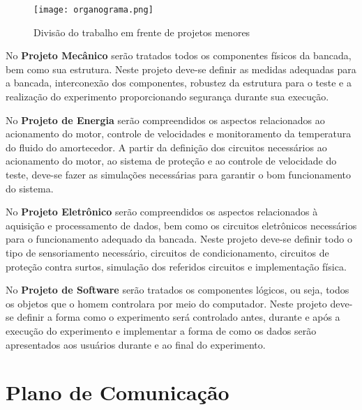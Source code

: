 		\newpage
		\begin{figure}[!h]
			\centering
			\texttt{[image: organograma.png]}
			\caption{Divisão do trabalho em frente de projetos menores}
			\label{organograma}
		\end{figure}

		No \textbf{Projeto Mecânico} serão tratados todos os componentes físicos da bancada, bem como sua estrutura. Neste projeto deve-se definir as medidas adequadas para a bancada, interconexão dos componentes, robustez da estrutura para o teste e a realização do experimento proporcionando segurança durante sua execução. 
		
		No \textbf{Projeto de Energia} serão compreendidos os aspectos relacionados ao acionamento do motor, controle de velocidades e monitoramento da temperatura do fluido do amortecedor. A partir da definição dos circuitos necessários ao acionamento do motor, ao sistema de proteção e ao controle de velocidade do teste, deve-se fazer as simulações necessárias para garantir o bom funcionamento do sistema.

		No \textbf{Projeto Eletrônico} serão compreendidos os aspectos relacionados à aquisição e processamento de dados, bem como os circuitos eletrônicos necessários para o funcionamento adequado da bancada. Neste projeto deve-se definir todo o tipo de sensoriamento necessário, circuitos de condicionamento, circuitos de proteção contra surtos, simulação dos referidos circuitos e implementação física.

		No \textbf{Projeto de Software} serão tratados os componentes lógicos, ou seja, todos os objetos que o homem controlara por meio do computador. Neste projeto deve-se definir a forma como o experimento será controlado antes, durante e após a execução do experimento e implementar a forma de como os dados serão apresentados aos usuários durante e ao final do experimento.


	\section{Plano de Comunicação}

